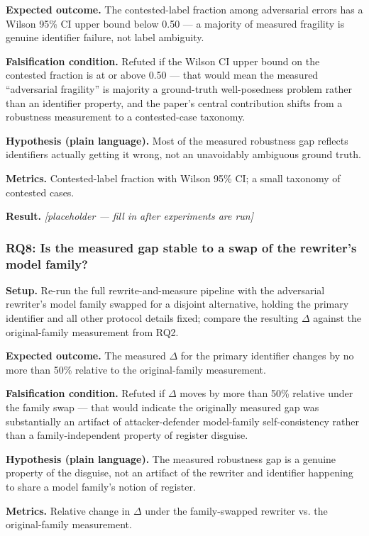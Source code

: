 \documentclass[11pt]{article}
\newcommand{\ph}{\textit{[placeholder --- fill in after experiments are run]}}
\begin{document}
\textbf{Expected outcome.} The contested-label fraction among adversarial errors has a Wilson 95\% CI upper bound below 0.50 --- a majority of measured fragility is genuine identifier failure, not label ambiguity.

\textbf{Falsification condition.} Refuted if the Wilson CI upper bound on the contested fraction is at or above 0.50 --- that would mean the measured ``adversarial fragility'' is majority a ground-truth well-posedness problem rather than an identifier property, and the paper's central contribution shifts from a robustness measurement to a contested-case taxonomy.

\textbf{Hypothesis (plain language).} Most of the measured robustness gap reflects identifiers actually getting it wrong, not an unavoidably ambiguous ground truth.

\textbf{Metrics.} Contested-label fraction with Wilson 95\% CI; a small taxonomy of contested cases.

\textbf{Result.} \ph

\subsubsection{RQ8: Is the measured gap stable to a swap of the rewriter's model family?}
\textbf{Setup.} Re-run the full rewrite-and-measure pipeline with the adversarial rewriter's model family swapped for a disjoint alternative, holding the primary identifier and all other protocol details fixed; compare the resulting $\Delta$ against the original-family measurement from RQ2.

\textbf{Expected outcome.} The measured $\Delta$ for the primary identifier changes by no more than 50\% relative to the original-family measurement.

\textbf{Falsification condition.} Refuted if $\Delta$ moves by more than 50\% relative under the family swap --- that would indicate the originally measured gap was substantially an artifact of attacker-defender model-family self-consistency rather than a family-independent property of register disguise.

\textbf{Hypothesis (plain language).} The measured robustness gap is a genuine property of the disguise, not an artifact of the rewriter and identifier happening to share a model family's notion of register.

\textbf{Metrics.} Relative change in $\Delta$ under the family-swapped rewriter vs. the original-family measurement.
\end{document}
